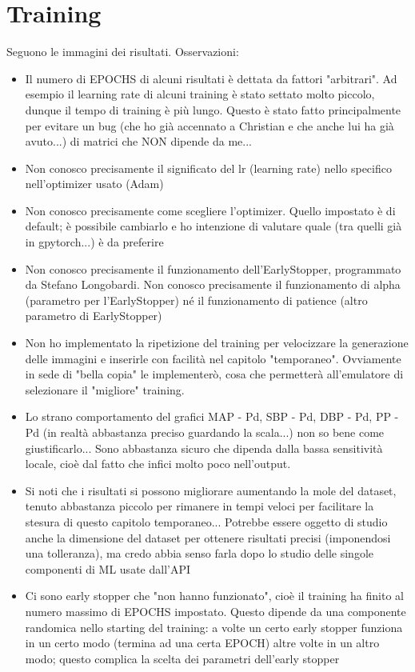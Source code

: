 \chapter{Training}

Seguono le immagini dei risultati. Osservazioni:
\begin{itemize}
    \item Il numero di EPOCHS di alcuni risultati è dettata da fattori "arbitrari". Ad esempio il learning rate di alcuni training è stato settato molto piccolo, dunque il tempo di training è più lungo. Questo è stato fatto principalmente per evitare un bug (che ho già accennato a Christian e che anche lui ha già avuto...) di matrici che NON dipende da me...
    \item Non conosco precisamente il significato del lr (learning rate) nello specifico nell'optimizer usato (Adam)
    \item Non conosco precisamente come scegliere l'optimizer. Quello impostato è di default; è possibile cambiarlo e ho intenzione di valutare quale (tra quelli già in gpytorch...) è da preferire
    \item Non conosco precisamente il funzionamento dell'EarlyStopper, programmato da Stefano Longobardi. Non conosco precisamente il funzionamento di alpha (parametro per l'EarlyStopper) né il funzionamento di patience (altro parametro di EarlyStopper)
    \item Non ho implementato la ripetizione del training per velocizzare la generazione delle immagini e inserirle con facilità nel capitolo "temporaneo". Ovviamente in sede di "bella copia" le implementerò, cosa che permetterà all'emulatore di selezionare il "migliore" training.
    \item Lo strano comportamento del grafici MAP - Pd, SBP - Pd, DBP - Pd, PP - Pd (in realtà abbastanza preciso guardando la scala...) non so bene come giustificarlo... Sono abbastanza sicuro che dipenda dalla bassa sensitività locale, cioè dal fatto che infici molto poco nell'output.
    \item Si noti che i risultati si possono migliorare aumentando la mole del dataset, tenuto abbastanza piccolo per rimanere in tempi veloci per facilitare la stesura di questo capitolo temporaneo... Potrebbe essere oggetto di studio anche la dimensione del dataset per ottenere risultati precisi (imponendosi una tolleranza), ma credo abbia senso farla dopo lo studio delle singole componenti di ML usate dall'API 
    \item Ci sono early stopper che "non hanno funzionato", cioè il training ha finito al numero massimo di EPOCHS impostato. Questo dipende da una componente randomica nello starting del training: a volte un certo early stopper funziona in un certo modo (termina ad una certa EPOCH) altre volte in un altro modo; questo complica la scelta dei parametri dell'early stopper
\end{itemize}

